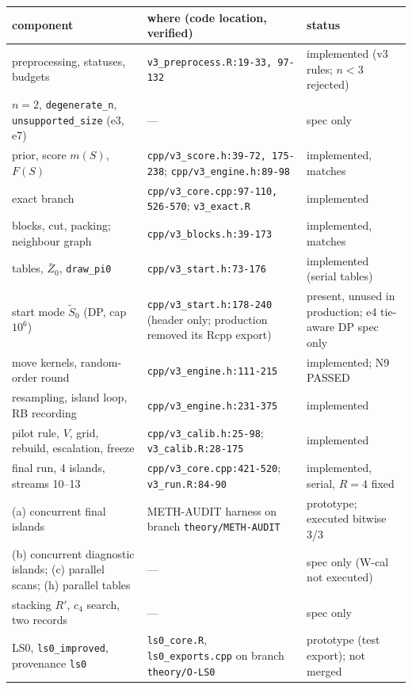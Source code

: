 {\footnotesize
\begin{xltabular}{\linewidth}{@{}>{\raggedright\arraybackslash}p{3.3cm}>{\raggedright\arraybackslash}X>{\raggedright\arraybackslash}p{3.1cm}@{}}
\toprule
component & where (code location, verified) & status\\
\midrule\endhead
preprocessing, statuses, budgets & \texttt{v3\_preprocess.R:19-33, 97-132} & implemented (v3 rules; $n<3$ rejected)\\
$n=2$, \texttt{degenerate\_n}, \texttt{unsupported\_size} (e3, e7) & --- & spec only\\
prior, score $m(S)$, $F(S)$ & \texttt{cpp/v3\_score.h:39-72, 175-238}; \texttt{cpp/v3\_engine.h:89-98} & implemented, matches\\
exact branch & \texttt{cpp/v3\_core.cpp:97-110, 526-570}; \texttt{v3\_exact.R} & implemented\\
blocks, cut, packing; neighbour graph & \texttt{cpp/v3\_blocks.h:39-173} & implemented, matches\\
tables, $\bar Z_0$, \texttt{draw\_pi0} & \texttt{cpp/v3\_start.h:73-176} & implemented (serial tables)\\
start mode $\tilde S_0$ (DP, cap $10^6$) & \texttt{cpp/v3\_start.h:178-240} (header only; production removed its Rcpp export) & present, unused in production; e4 tie-aware DP spec only\\
move kernels, random-order round & \texttt{cpp/v3\_engine.h:111-215} & implemented; N9 PASSED\\
resampling, island loop, RB recording & \texttt{cpp/v3\_engine.h:231-375} & implemented\\
pilot rule, $V$, grid, rebuild, escalation, freeze & \texttt{cpp/v3\_calib.h:25-98}; \texttt{v3\_calib.R:28-175} & implemented\\
final run, 4 islands, streams 10--13 & \texttt{cpp/v3\_core.cpp:421-520}; \texttt{v3\_run.R:84-90} & implemented, serial, $R=4$ fixed\\
(a) concurrent final islands & METH-AUDIT harness on branch \texttt{theory/METH-AUDIT} & prototype; executed bitwise 3/3\\
(b) concurrent diagnostic islands; (c) parallel scans; (h) parallel tables & --- & spec only (W-cal not executed)\\
stacking $R'$, $c_4$ search, two records & --- & spec only\\
LS0, \texttt{ls0\_improved}, provenance \texttt{ls0} & \texttt{ls0\_core.R}, \texttt{ls0\_exports.cpp} on branch \texttt{theory/O-LS0} & prototype (test export); not merged\\

\end{xltabular}}
